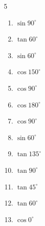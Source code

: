 \begin{multicols}{5}
\begin{enumerate}
  \item $\displaystyle \sin{90^\circ}$

        \phantom{$\displaystyle =1$}

  \item $\displaystyle \tan{60^\circ}$


  \item $\displaystyle \sin{60^\circ}$


  \item $\displaystyle \cos{150^\circ}$


  \item $\displaystyle \cos{90^\circ}$

        \phantom{$\displaystyle =0$}

\columnbreak %

  \item $\displaystyle \cos{180^\circ}$

        \phantom{$\displaystyle =-1$}

  \item $\displaystyle \cos{90^\circ}$

        \phantom{$\displaystyle =0$}

  \item $\displaystyle \sin{60^\circ}$


  \item $\displaystyle \tan{135^\circ}$

        \phantom{$\displaystyle =-1$}

  \item $\displaystyle \tan{90^\circ}$

        \phantom{$\displaystyle なし$}

  \item $\displaystyle \tan{45^\circ}$

        \phantom{$\displaystyle =1$}

  \item $\displaystyle \tan{60^\circ}$


  \item $\displaystyle \cos{0^\circ}$


\end{enumerate}
\end{multicols}
